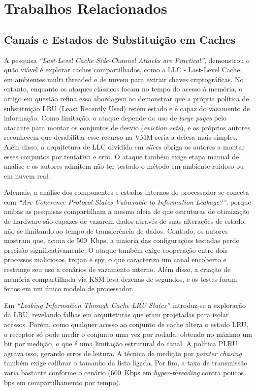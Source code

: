 \documentclass[12pt]{article}
\begin{document}
\section{Trabalhos Relacionados}

\subsection{Canais e Estados de Substituição em Caches}

A pesquisa \textit{“Last-Level Cache Side-Channel Attacks are Practical”}\cite{7163050}, demonstrou o quão viável é explorar caches compartilhados, como a LLC - Last-Level Cache, em ambientes multi threaded e de nuvem para extrair chaves criptográficas. No entanto, enquanto os ataques clássicos focam no tempo do acesso à memória, o artigo em questão refina essa abordagem ao demonstrar que a própria política de substituição LRU (Least Recently Used) retém estado e é capaz do vazamento de informação. Como limitação, o ataque depende do uso de \textit{large pages} pelo atacante para montar os conjuntos de desvio (\textit{eviction sets}), e os próprios autores reconhecem que desabilitar esse recurso na VMM seria a defesa mais simples. Além disso, a arquitetura de LLC dividida em \textit{slices} obriga os autores a montar esses conjuntos por tentativa e erro. O ataque também exige etapa manual de análise e os autores admitem não ter testado o método em ambiente ruidoso ou em nuvem real.

Ademais, a análise dos componentes e estados internos do processador se conecta com \textit{“Are Coherence Protocol States Vulnerable to Information Leakage?”}\cite{8327007}, porque ambas as pesquisas compartilham a mesma ideia de que estruturas de otimização de hardware são capazes de vazarem dados através de suas alterações de estado, não se limitando ao tempo de transferência de dados. Contudo, os autores mostram que, acima de 500~Kbps, a maioria das configurações testadas perde precisão significativamente. O ataque também exige cooperação entre dois processos maliciosos, trojan e spy, o que caracteriza um canal encoberto e restringe seu uso a cenários de vazamento interno. Além disso, a criação de memória compartilhada via KSM leva dezenas de segundos, e os testes foram feitos em um único modelo de processador.

Em \textit{“Leaking Information Through Cache LRU States”}\cite{9065598} introduz-se a exploração da LRU, revelando falhas em arquiteturas que eram projetadas para isolar acessos. Porém, como qualquer acesso ao conjunto de cache altera o estado LRU, o receptor só pode medir o conjunto uma vez por rodada, obtendo no máximo um bit por medição, o que é uma limitação estrutural do canal. A política PLRU agrava isso, gerando erros de leitura. A técnica de medição por \textit{pointer chasing} também exige calibrar o tamanho da lista ligada. Por fim, a taxa de transmissão varia bastante conforme o cenário (600~Kbps em \textit{hyper-threading} contra poucos bps em compartilhamento por tempo).
\end{document}
